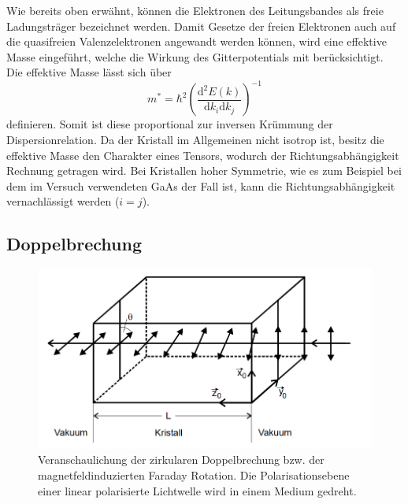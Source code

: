 Wie bereits oben erwähnt, können die Elektronen des Leitungsbandes als freie Ladungsträger bezeichnet werden.
Damit Gesetze der freien Elektronen auch auf die quasifreien Valenzelektronen angewandt werden können, wird eine effektive Masse eingeführt, welche die Wirkung des Gitterpotentials mit berücksichtigt.
Die effektive Masse lässt sich über
\begin{equation}
    m^* = \hbar^2 \left( \frac{\text{d}^2E(k)}{\text{d}k_i \text{d}k_j} \right)^{-1}
\end{equation}
definieren.
Somit ist diese proportional zur inversen Krümmung der Dispersionrelation.
Da der Kristall im Allgemeinen nicht isotrop ist, besitz die effektive Masse den Charakter eines Tensors, wodurch der Richtungsabhängigkeit Rechnung getragen wird.
Bei Kristallen hoher Symmetrie, wie es zum Beispiel bei dem im Versuch verwendeten GaAs der Fall ist, kann die Richtungsabhängigkeit vernachlässigt werden ($i=j$).



\subsection{Doppelbrechung}

\begin{figure}
    \centering
    \includegraphics[width=.9\textwidth]{Bilder/Farad_Rot.PNG}
    \caption{Veranschaulichung der zirkularen Doppelbrechung bzw. der magnetfeldinduzierten Faraday Rotation. Die Polarisationsebene einer linear polarisierte Lichtwelle wird in einem Medium gedreht. \cite{V46}}
    \label{fig:farad_rot}
\end{figure}



